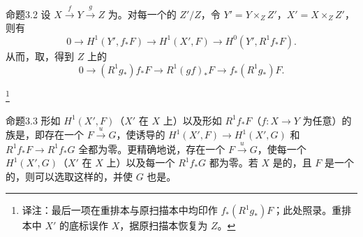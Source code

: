 \begin{SGAresult}{命题}{3.2}
设 $X\xrightarrow{f}Y\xrightarrow{g}Z$ 为。对每一个的 $Z'/Z$，令 $Y'=Y\times_Z Z'$，$X'=X\times_Z Z'$，则有
\[
0\longrightarrow H^1(Y',f_*F)\longrightarrow H^1(X',F)\longrightarrow H^0(Y',R^1f_*F).
\]
从而，取，得到 $Z$ 上的
\[
0\longrightarrow(R^1g_*)f_*F\longrightarrow R^1(gf)_*F\longrightarrow f_*(R^1g_*)F.
\]
\end{SGAresult}
\footnote{译注：最后一项在重排本与原扫描本中均印作 $f_*(R^1g_*)F$；此处照录。重排本中 $X'$ 的底标误作 $X$，据原扫描本恢复为 $Z$。}

\begin{SGAresult}{命题}{3.3}
形如 $H^1(X',F)$（$X'$ 在 $X$ 上）以及形如 $R^1f_*F$（$f:X\to Y$ 为任意）的族是，即存在一个 $F\xrightarrow{u}G$，使诱导的 $H^1(X',F)\to H^1(X',G)$ 和 $R^1f_*F\to R^1f_*G$ 全都为零。更精确地说，存在一个 $F\xrightarrow{u}G$，使每一个 $H^1(X',G)$（$X'$ 在 $X$ 上）以及每一个 $R^1f_*G$ 都为零。若 $X$ 是的，且 $F$ 是一个的，则可以选取这样的，并使 $G$ 也是。
\end{SGAresult}
